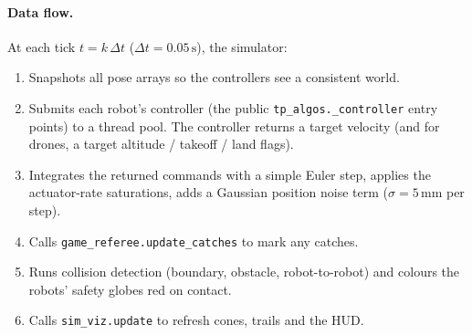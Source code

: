 \documentclass[11pt,a4paper]{article}
\newcommand{\code}[1]{\texttt{#1}}
\begin{document}
\paragraph{Data flow.}
At each tick $t = k\,\Delta t$ ($\Delta t = 0.05\,\text{s}$), the simulator:
\begin{enumerate}[leftmargin=1.4em]
  \item Snapshots all pose arrays so the controllers see a consistent world.
  \item Submits each robot's controller (the public
        \code{tp\_algos.\*\_controller} entry points) to a thread pool. The
        controller returns a target velocity (and for drones, a target
        altitude / takeoff / land flags).
  \item Integrates the returned commands with a simple Euler step, applies
        the actuator-rate saturations, adds a Gaussian position noise term
        ($\sigma = 5\,\text{mm}$ per step).
  \item Calls \code{game\_referee.update\_catches} to mark any catches.
  \item Runs collision detection (boundary, obstacle, robot-to-robot) and
        colours the robots' safety globes red on contact.
  \item Calls \code{sim\_viz.update} to refresh cones, trails and the HUD.
\end{enumerate}
\end{document}
